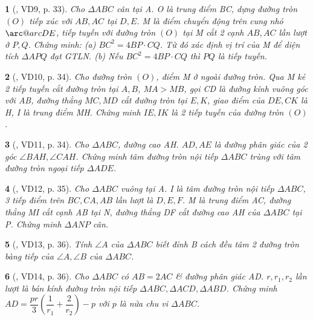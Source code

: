 \documentclass{article}
\makeatletter
\newcommand{\arc@char}{{\usefont{U}{tipa}{m}{n}\symbol{62}}}%
\newcommand{\arc}[1]{\mathpalette\arc@arc{#1}}
\newcommand{\arc@arc}[2]{%
	\sbox0{$\m@th#1#2$}%
	\vbox{
		\hbox{\resizebox{\wd0}{\height}{\arc@char}}
		\nointerlineskip
		\box0
	}%
}
\newtheorem{baitoan}{}
\makeatother
\begin{document}
\begin{baitoan}[\cite{TLCT_THCS_Toan_9_hinh_hoc}, VD9, p. 33]
	Cho $\Delta ABC$ cân tại A. O là trung điểm BC, dựng đường tròn $(O)$ tiếp xúc với $AB,AC$ tại $D,E$. M là điểm chuyển động trên cung nhỏ $\arc{DE}$, tiếp tuyến với đường tròn $(O)$ tại M cắt 2 cạnh $AB,AC$ lần lượt ở $P,Q$. Chứng minh: (a) $BC^2 = 4BP\cdot CQ$. Từ đó xác định vị trí của M để diện tích $\Delta APQ$ đạt {\rm GTLN}. (b) Nếu $BC^2 = 4BP\cdot CQ$ thì $PQ$ là tiếp tuyến.
\end{baitoan}

\begin{baitoan}[\cite{TLCT_THCS_Toan_9_hinh_hoc}, VD10, p. 34]
	Cho đường tròn $(O)$, điểm M ở ngoài đường tròn. Qua M kẻ 2 tiếp tuyến cắt đường tròn tại $A,B$, $MA > MB$, gọi CD là đường kính vuông góc với AB, đường thẳng $MC,MD$ cắt đường tròn tại $E,K$, giao điểm của $DE,CK$ là H, I là trung điểm MH. Chứng minh $IE,IK$ là 2 tiếp tuyến của đường tròn $(O)$.
\end{baitoan}

\begin{baitoan}[\cite{TLCT_THCS_Toan_9_hinh_hoc}, VD11, p. 34]
	Cho $\Delta ABC$, đường cao AH. $AD,AE$ là đường phân giác của 2 góc $\angle{BAH},\angle{CAH}$. Chứng minh tâm đường tròn nội tiếp $\Delta ABC$ trùng với tâm đường tròn ngoại tiếp $\Delta ADE$.
\end{baitoan}

\begin{baitoan}[\cite{TLCT_THCS_Toan_9_hinh_hoc}, VD12, p. 35]
	Cho $\Delta ABC$ vuông tại A. I là tâm đường tròn nội tiếp $\Delta ABC$, 3 tiếp điểm trên $BC,CA,AB$ lần lượt là $D,E,F$. M là trung điểm AC, đường thẳng MI cắt cạnh AB tại N, đường thẳng DF cắt đường cao AH của $\Delta ABC$ tại P. Chứng minh $\Delta ANP$ cân.
\end{baitoan}

\begin{baitoan}[\cite{TLCT_THCS_Toan_9_hinh_hoc}, VD13, p. 36]
	Tính $\angle{A}$ của $\Delta ABC$ biết đỉnh B cách đều tâm 2 đường tròn bàng tiếp của $\angle{A},\angle{B}$ của $\Delta ABC$.
\end{baitoan}

\begin{baitoan}[\cite{TLCT_THCS_Toan_9_hinh_hoc}, VD14, p. 36]
	Cho $\Delta ABC$ có $AB = 2AC$ \& đường phân giác AD. $r,r_1,r_2$ lần lượt là bán kính đường tròn nội tiếp $\Delta ABC,\Delta ACD,\Delta ABD$. Chứng minh $AD = \dfrac{pr}{3}\left(\dfrac{1}{r_1} + \dfrac{2}{r_2}\right) - p$ với $p$ là nửa chu vi $\Delta ABC$.
\end{baitoan}
\end{document}
